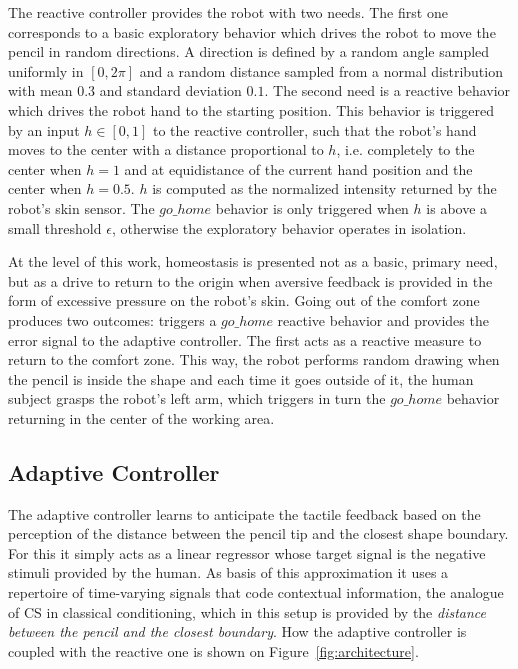 \documentclass[letterpaper, 10 pt, conference]{ieeeconf}  %
\begin{document}
The reactive controller provides the robot with two needs. The first one corresponds to a basic exploratory behavior which drives the robot to move the pencil in random directions. A direction is defined by a random angle sampled uniformly in $[0, 2\pi]$ and a random distance  sampled from a normal distribution with mean $0.3$ and standard deviation $0.1$. The second need is a reactive behavior which drives the robot hand to the starting position. This behavior is triggered by an input $h \in [0,1]$ to the reactive controller, such that the robot's hand moves to the center with a distance proportional to $h$, i.e. completely to the center when $h=1$ and at equidistance of the current hand position and the center when $h=0.5$. $h$ is computed as the normalized intensity returned by the robot's skin sensor. The $go\_home$ behavior is only triggered when $h$ is above a small threshold $\epsilon$, otherwise the exploratory behavior operates in isolation. 

At the level of this work, homeostasis is presented not as a basic, primary need, but as a drive to return to the origin when aversive feedback is provided in the form of excessive pressure on the robot's skin. Going out of the comfort zone produces two outcomes: triggers a $go\_home$ reactive behavior and provides the error signal to the adaptive controller. The first acts as a reactive measure to return to the comfort zone. This way, the robot performs random drawing when the pencil is inside the shape and each time it goes outside of it, the human subject grasps the robot's left arm, which triggers in turn the $go\_home$ behavior returning in the center of the working area.


\subsection{Adaptive Controller}

The adaptive controller learns to anticipate the tactile feedback based on the perception of the distance between the pencil tip and the closest shape boundary. For this it simply acts as a linear regressor whose target signal is the negative stimuli provided by the human. As basis of this approximation it uses a repertoire of time-varying signals that code contextual information, the analogue of CS in classical conditioning, which in this setup is provided by the \emph{distance between the pencil and the closest boundary}. How the adaptive controller is coupled with the reactive one is shown on Figure~\ref{fig:architecture}. 
\end{document}
